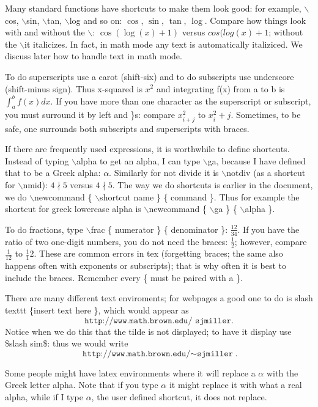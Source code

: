 \documentclass[12pt,reqno]{amsart}
\newcommand{\ga}{\alpha}                  %
\newcommand{\notdiv}{\nmid}               %
\numberwithin{equation}{section}
\begin{document}
Many standard functions have shortcuts to make them look good: for
example, $\backslash$cos, $\backslash$sin, $\backslash$tan,
$\backslash$log and so on: $\cos$, $\sin$, $\tan$, $\log$. Compare
how things look with and without the $\backslash$: $\cos(\log(x) +
1)$ versus $cos(log(x)+1$; without the $\backslash$it italicizes.
In fact, in math mode any text is automatically italiziced. We
discuss later how to handle text in math mode.

To do superscripts use a carot (shift-six) and to do subscripts
use underscore (shift-minus sign). Thus x-squared is $x^2$ and
integrating f(x) from a to b is $\int_a^b f(x)dx$. If you have
more than one character as the superscript or subscript, you  must
surround it by left and \}s: compare $x^2_{i+j}$ to $x^2_i+j$.
Sometimes, to be safe, one surrounds both subscripts and
superscripts with braces.

If there are frequently used expressions, it is worthwhile to
define shortcuts. Instead of typing $\backslash$alpha to get an
alpha, I can type $\backslash$ga, because I have defined that to
be a Greek alpha: $\ga$. Similarly for not divide it is
$\backslash$notdiv (as a shortcut for $\backslash$nmid): $4
\notdiv 5$ versus $4 \nmid 5$. The way we do shortcuts is earlier
in the document, we do $\backslash$newcommand \{
$\backslash$shortcut name \} \{ command \}. Thus for example the
shortcut for greek lowercase alpha is $\backslash$newcommand \{
$\backslash$ga \} \{ $\backslash$alpha \}.

To do fractions, type $\backslash$frac \{ numerator \} \{
denominator \}: $\frac{12}{34}$. If you have the ratio of two
one-digit numbers, you do not need the braces: $\frac12$; however,
compare $\frac{1}{12}$ to $\frac112$. These are common errors in
tex (forgetting braces; the same also happens often with exponents
or subscripts); that is why often it is best to include the
braces. Remember every \{ must be paired with a \}.

There are many different text enviroments; for webpages a good one
to do is slash texttt \{insert text here \}, which would appear as
$$\texttt{http://www.math.brown.edu/~sjmiller}.$$ Notice when we do
this that the tilde is not displayed; to have it display use \$slash
sim\$: thus we would write
$$\texttt{http://www.math.brown.edu/$\sim$sjmiller}.$$

Some people might have latex environments where it will replace a
$\alpha$ with the Greek letter alpha. Note that if you type
$\alpha$ it might replace it with what a real alpha, while if I
type $\ga$, the user defined shortcut, it does not replace.
\end{document}
